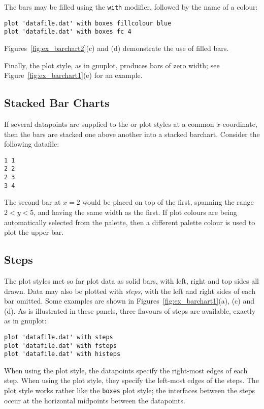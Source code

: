 The bars may be filled using the {\tt with}  modifier,
followed by the name of a colour:

\begin{verbatim} 
plot 'datafile.dat' with boxes fillcolour blue
plot 'datafile.dat' with boxes fc 4
\end{verbatim}

\noindent Figures~\ref{fig:ex_barchart2}(c) and (d) demonstrate the use of
filled bars.

Finally, the  plot style, as in gnuplot, produces bars of zero
width; see Figure~\ref{fig:ex_barchart1}(e) for an example.

\subsection{Stacked Bar Charts}

If several datapoints are supplied to the  or 
plot styles at a common $x$-coordinate, then the bars are stacked one above
another into a stacked barchart. Consider the following datafile:

\begin{verbatim} 
1 1
2 2
2 3
3 4
\end{verbatim}

\noindent The second bar at $x=2$ would be placed on top of the first, spanning
the range $2<y<5$, and having the same width as the first. If plot colours are
being automatically selected from the palette, then a different palette colour
is used to plot the upper bar.

\subsection{Steps}

The plot styles met so far plot data as solid bars, with left, right and top
sides all drawn. Data may also be plotted with {\it steps}, with the left and
right sides of each bar omitted. Some examples are shown in
Figures~\ref{fig:ex_barchart1}(a), (c) and (d).  As is illustrated in these
panels, three flavours of steps are available, exactly as in gnuplot:

\begin{verbatim}
plot 'datafile.dat' with steps 
plot 'datafile.dat' with fsteps 
plot 'datafile.dat' with histeps
\end{verbatim}

When using the  plot style, the datapoints specify the right-most
edges of each step. When using the  plot style, they specify the
left-most edges of the steps. The  plot style works rather like
the {\tt boxes} plot style; the interfaces between the steps occur at the
horizontal midpoints between the datapoints.

